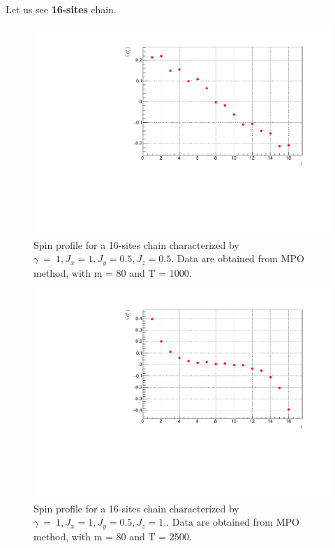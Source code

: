 Let us see \textbf{16-sites} chain.

\begin{figure}[H]
    \centering
    \includegraphics[scale=0.7]{Figures/16sites/LML016m080Time001000_J10505.pdf}
    \caption{Spin profile for a 16-sites chain characterized by $\gamma~=~1, J_x=1, J_y=0.5, J_z=0.5$. Data are obtained from MPO method, with m = 80 and T = 1000.}
    \label{fig:my_label}
\end{figure}

\begin{figure}[H]
    \centering
    \includegraphics[scale=0.7]{Figures/16sites/LML016m080Time002500_J1051.pdf}
    \caption{Spin profile for a 16-sites chain characterized by $\gamma~=~1, J_x=1, J_y=0.5, J_z=1.$. Data are obtained from MPO method, with m = 80 and T = 2500.}
    \label{fig:my_label}
\end{figure}



